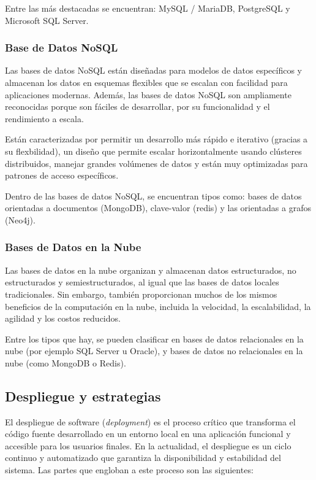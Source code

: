 Entre las más destacadas se encuentran: MySQL / MariaDB, PostgreSQL y Microsoft SQL Server.

\subsubsection{Base de Datos NoSQL \cite{baseDatosNoSQL}}

Las bases de datos NoSQL están diseñadas para modelos de datos específicos y almacenan los datos en esquemas flexibles 
que se escalan con facilidad para aplicaciones modernas. Además, las bases de datos NoSQL son ampliamente reconocidas 
porque son fáciles de desarrollar, por su funcionalidad y el rendimiento a escala.

Están caracterizadas por permitir un desarrollo más rápido e iterativo (gracias a su flexbilidad), un diseño que permite
escalar horizontalmente usando clústeres distribuidos, manejar grandes volúmenes de datos y están muy optimizadas para 
patrones de acceso específicos.

Dentro de las bases de datos NoSQL, se encuentran tipos como: bases de datos orientadas a documentos (MongoDB), clave-valor
(redis) y las orientadas a grafos (Neo4j).

\subsubsection{Bases de Datos en la Nube \cite{baseDatosNube}}

Las bases de datos en la nube organizan y almacenan datos estructurados, no estructurados y semiestructurados, al igual 
que las bases de datos locales tradicionales. Sin embargo, también proporcionan muchos de los mismos beneficios de la 
computación en la nube, incluida la velocidad, la escalabilidad, la agilidad y los costos reducidos.

Entre los tipos que hay, se pueden clasificar en bases de datos relacionales en la nube (por ejemplo SQL Server u Oracle), 
y bases de datos no relacionales en la nube (como MongoDB o Redis).

\subsection{Despliegue y estrategias}

El despliegue de software (\textit{deployment}) es el proceso crítico que transforma el código fuente desarrollado en 
un entorno local en una aplicación funcional y accesible para los usuarios finales. En la actualidad, el despliegue es 
un ciclo continuo y automatizado que garantiza la disponibilidad y estabilidad del sistema. Las partes que engloban a este
proceso son las siguientes: 

